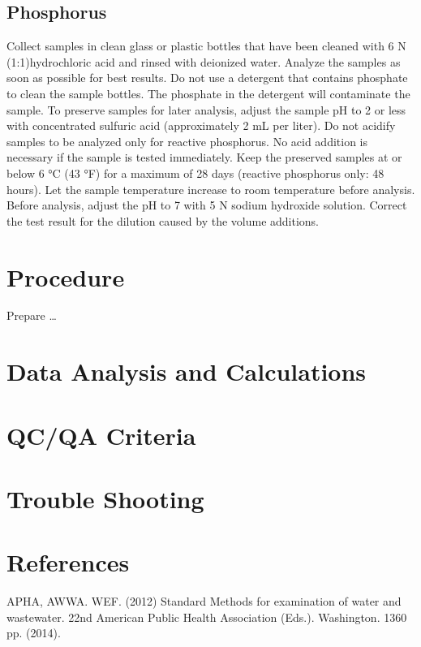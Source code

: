 \documentclass[12pt]{../SOP4_alpha}\usepackage[]{graphicx}\usepackage[]{xcolor}
\begin{document}
\subsection{Phosphorus}
\NP Collect samples in clean glass or plastic bottles that have been cleaned with 6 N (1:1)hydrochloric acid and rinsed with deionized water.
\NP Analyze the samples as soon as possible for best results.
\NP Do not use a detergent that contains phosphate to clean the sample bottles. The
phosphate in the detergent will contaminate the sample.
\NP To preserve samples for later analysis, adjust the sample pH to 2 or less with
concentrated sulfuric acid (approximately 2 mL per liter). Do not acidify samples to be analyzed only for reactive phosphorus. No acid addition is necessary if the sample is tested immediately.
\NP Keep the preserved samples at or below 6 °C (43 °F) for a maximum of 28 days
(reactive phosphorus only: 48 hours). 
\NP Let the sample temperature increase to room temperature before analysis.
\NP Before analysis, adjust the pH to 7 with 5 N sodium hydroxide solution.
\NP Correct the test result for the dilution caused by the volume additions. 

\section{Procedure}

\NP Prepare \dots

\NP

\section{Data Analysis and Calculations}

\section{QC/QA Criteria}

\section{Trouble Shooting}

\section{References}

\NP APHA, AWWA. WEF. (2012) Standard Methods for examination of water and wastewater. 22nd American Public Health Association (Eds.). Washington. 1360 pp. (2014).
\end{document}
